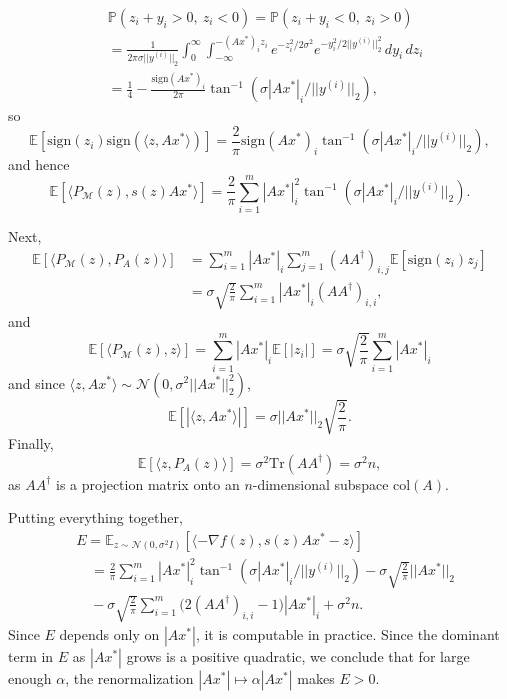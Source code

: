 \documentclass[journal]{IEEEtran}
\theoremstyle{definition}
\theoremstyle{remark}
\theoremstyle{definition}
\theoremstyle{problem}
\theoremstyle{definition}
\newcommand{\Tr}{\text{Tr}}
\newcommand{\col}{\text{col}}
\newcommand{\sign}{\text{sign}}
\newcommand{\atan}{\tan^{-1}}
\newcommand{\MM}{\mathcal{M}}
\newcommand{\PP}{\mathbb{P}}
\newcommand{\EE}{\mathbb{E}}
\begin{document}
\[\begin{aligned} &\PP(z_i + y_i > 0,\ z_i < 0) = \PP(z_i + y_i < 0,\ z_i > 0)\\
&= \frac{1}{2\pi\sigma||y^{(i)}||_2}\int_0^{\infty}\int_{-\infty}^{-(Ax^*)_iz_i}e^{-z_i^2/2\sigma^2}e^{-y_i^2/2||y^{(i)}||_2^2}\, dy_i\, dz_i\\
&= \frac{1}{4} - \frac{\sign(Ax^*)_i}{2\pi}\atan(\sigma|Ax^*|_i/||y^{(i)}||_2),\end{aligned}\]
so
\[ \EE[\sign(z_i)\sign(\langle z,Ax^*\rangle)] = \frac{2}{\pi}\sign(Ax^*)_i\atan(\sigma|Ax^*|_i/||y^{(i)}||_2),\]
and hence
\[\EE\left[\langle P_{\MM}(z), s(z)Ax^*\rangle\right] = \frac{2}{\pi}\sum_{i=1}^m|Ax^*|_i^2\atan(\sigma|Ax^*|_i/||y^{(i)}||_2).\]

Next,
\[\begin{aligned} \EE[\langle P_{\MM}(z), P_A(z)\rangle] &= \sum_{i=1}^m|Ax^*|_i\sum_{j=1}^m(AA^{\dagger})_{i,j}\EE[\sign(z_i)z_j] \\&= \sigma\sqrt{\frac{2}{\pi}}\sum_{i=1}^m|Ax^*|_i(AA^{\dagger})_{i,i},\end{aligned}\]
and
\[\EE\left[\langle P_{\MM}(z),z\rangle\right] = \sum_{i=1}^m|Ax^*|_i\EE[|z_i|] = \sigma\sqrt{\frac{2}{\pi}}\sum_{i=1}^m|Ax^*|_i\]
and since $\langle z,Ax^*\rangle\sim\mathcal{N}(0, \sigma^2||Ax^*||_2^2)$,
\[\EE[|\langle z,Ax^*\rangle|] = \sigma||Ax^*||_2\sqrt{\frac{2}{\pi}}.\]
Finally,
\[\EE[\langle z, P_A(z)\rangle] = \sigma^2\Tr(AA^{\dagger}) = \sigma^2n,\]
as $AA^{\dagger}$ is a projection matrix onto an $n$-dimensional subspace $\col(A)$.

Putting everything together,
\[\begin{aligned}&E=\EE_{z\sim \mathcal{N}(0,\sigma^2I)}\left[\langle -\nabla f(z), s(z)Ax^*-z\rangle\right]\\
&\quad= \frac{2}{\pi}\sum_{i=1}^m|Ax^*|_i^2\atan(\sigma|Ax^*|_i/||y^{(i)}||_2) - \sigma\sqrt{\frac{2}{\pi}}||Ax^*||_2\\
&\quad- \sigma\sqrt{\frac{2}{\pi}}\sum_{i=1}^m\Big(2(AA^{\dagger})_{i,i}-1\Big)|Ax^*|_i + \sigma^2n.\end{aligned}\]
Since $E$ depends only on $|Ax^*|$, it is computable in practice. Since the dominant term in $E$ as $|Ax^*|$ grows is a positive quadratic, we conclude that for large enough $\alpha$, the renormalization $|Ax^*|\mapsto \alpha|Ax^*|$ makes $E>0$.
\end{document}
